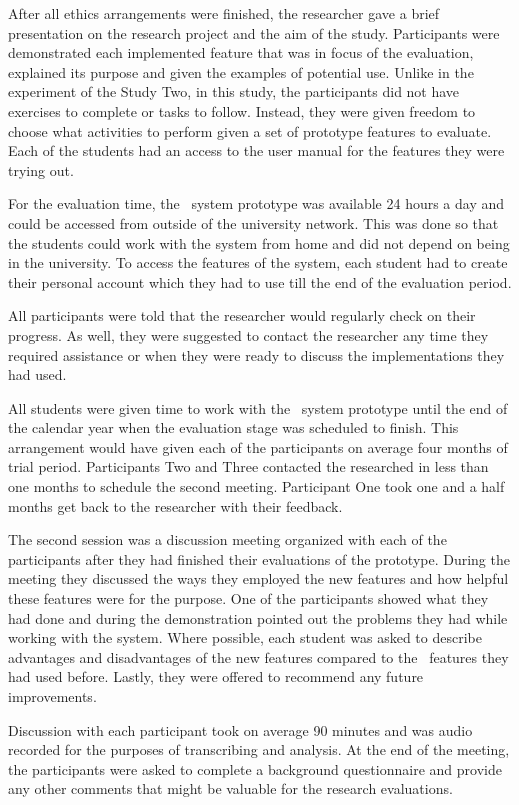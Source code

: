 After all ethics arrangements were finished, the researcher gave a brief
presentation on the research project and the aim of the study. Participants were
demonstrated each implemented feature that was in focus of the evaluation,
explained its purpose and given the examples of potential use. Unlike in the
experiment of the Study Two, in this study, the participants did not have
exercises to complete or tasks to follow. Instead, they were given freedom to
choose what activities to perform given a set of prototype features to evaluate.
Each of the students had an access to the user manual for the features they were
trying out. 

For the evaluation time, the \ep~system prototype was available 24 hours a day
and could be accessed from outside of the university network. This was done so
that the students could work with the system from home and did not depend on
being in the university. To access the features of the system, each student had
to create their personal account which they had to use till the end of the
evaluation period.

All participants were told that the researcher would regularly check on their
progress. As well, they were suggested to contact the researcher any time they
required assistance or when they were ready to discuss the implementations they
had used.

All students were given time to work with the \ep~system prototype until the end
of the calendar year when the evaluation stage was scheduled to finish. This
arrangement would have given each of the participants on average four months of
trial period. Participants Two and Three contacted the researched in less than
one months to schedule the second meeting. Participant One took one and a half
months get back to the researcher with their feedback.

The second session was a discussion meeting organized with each of the
participants after they had finished their evaluations of the prototype. During
the meeting they discussed the ways they employed the new features and how
helpful these features were for the purpose. One of the participants showed
what they had done and during the demonstration pointed out the problems they
had while working with the system. Where possible, each student was asked to
describe advantages and disadvantages of the new features compared to the
\ep~features they had used before. Lastly, they were offered to recommend any
future improvements.

Discussion with each participant took on average 90 minutes and was audio
recorded for the purposes of transcribing and analysis. At the end of the
meeting, the participants were asked to complete a background questionnaire and
provide any other comments that might be valuable for the research evaluations.

